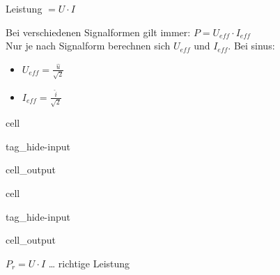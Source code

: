 \documentclass[letterpaper,10pt,english]{jupyterBook}
\begin{document}
\begin{DUlineblock}{0em}
\item[] 
\end{DUlineblock}

\begin{DUlineblock}{0em}
\item[] 
\end{DUlineblock}

\sphinxAtStartPar
Leistung \(= U\cdot I\)

\sphinxAtStartPar
Bei verschiedenen Signalformen gilt immer: \(P = U_{eff}\cdot I_{eff}\)\\
Nur je nach Signalform berechnen sich \(U_{eff}\) und \(I_{eff}\).
Bei sinus:
\begin{itemize}
\item {} 
\sphinxAtStartPar
\(U_{eff} = \frac{\hat{u}}{\sqrt{2}}\)

\item {} 
\sphinxAtStartPar
\(I_{eff} = \frac{\hat{i}}{\sqrt{2}}\)

\end{itemize}

\begin{DUlineblock}{0em}
\item[] 
\end{DUlineblock}

\begin{sphinxuseclass}{cell}
\begin{sphinxuseclass}{tag_hide-input}\begin{sphinxVerbatimOutput}

\begin{sphinxuseclass}{cell_output}
\noindent{}

\end{sphinxuseclass}\end{sphinxVerbatimOutput}

\end{sphinxuseclass}
\end{sphinxuseclass}
\begin{sphinxuseclass}{cell}
\begin{sphinxuseclass}{tag_hide-input}\begin{sphinxVerbatimOutput}

\begin{sphinxuseclass}{cell_output}
\noindent{}

\end{sphinxuseclass}\end{sphinxVerbatimOutput}

\end{sphinxuseclass}
\end{sphinxuseclass}
\sphinxAtStartPar
\(P_r = U\cdot I\) … richtige Leistung
\end{document}
